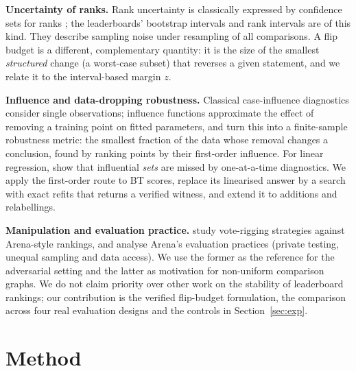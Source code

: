 \documentclass{article}
\begin{document}
\textbf{Uncertainty of ranks.} Rank uncertainty is classically expressed by confidence sets for ranks \citep{mogstad2020inference}; the leaderboards' bootstrap intervals and rank intervals are of this kind. They describe sampling noise under resampling of all comparisons. A flip budget is a different, complementary quantity: it is the size of the smallest \emph{structured} change (a worst-case subset) that reverses a given statement, and we relate it to the interval-based margin $z$.

\textbf{Influence and data-dropping robustness.} Classical case-influence diagnostics \citep{cook1977detection} consider single observations; influence functions \citep{koh2017influence} approximate the effect of removing a training point on fitted parameters, and \citet{broderick2020automatic} turn this into a finite-sample robustness metric: the smallest fraction of the data whose removal changes a conclusion, found by ranking points by their first-order influence. For linear regression, \citet{kuschnig2021hidden} show that influential \emph{sets} are missed by one-at-a-time diagnostics. We apply the first-order route to BT scores, replace its linearised answer by a search with exact refits that returns a verified witness, and extend it to additions and relabellings.

\textbf{Manipulation and evaluation practice.} \citet{min2025rigging} study vote-rigging strategies against Arena-style rankings, and \citet{singh2025illusion} analyse Arena's evaluation practices (private testing, unequal sampling and data access). We use the former as the reference for the adversarial setting and the latter as motivation for non-uniform comparison graphs. We do not claim priority over other work on the stability of leaderboard rankings; our contribution is the verified flip-budget formulation, the comparison across four real evaluation designs and the controls in Section~\ref{sec:exp}.



\section{Method}
\label{sec:method}
\end{document}
